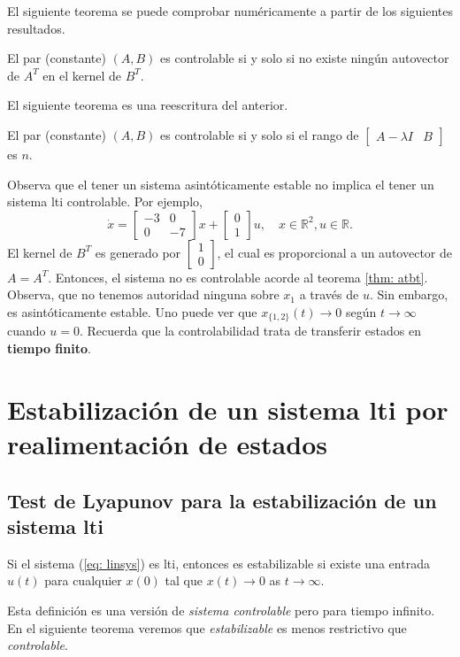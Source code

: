 El siguiente teorema se puede comprobar numéricamente a partir de los siguientes resultados.
\begin{theorem}
	\label{thm: atbt}
	El par (constante) $(A,B)$ es controlable si y solo si no existe ningún autovector de $A^T$ en el kernel de $B^T$.
\end{theorem}
El siguiente teorema es una reescritura del anterior.
\begin{theorem}
El par (constante) $(A,B)$ es controlable si y solo si el rango de $\begin{bmatrix}A-\lambda I & B\end{bmatrix}$ es $n$.
\end{theorem}

\begin{remark}
	Observa que el tener un sistema asintóticamente estable no implica el tener 
	un sistema lti controlable. Por ejemplo, 
\begin{equation}
	\dot x = \begin{bmatrix}-3 & 0 \\ 0 & -7\end{bmatrix}x + \begin{bmatrix}0 \\ 1\end{bmatrix}u, \quad x\in\mathbb{R}^2, u\in\mathbb{R}.
\end{equation}
	El kernel de $B^T$ es generado por $\begin{bmatrix}1 \\ 0\end{bmatrix}$, el cual es proporcional a un autovector de $A = A^T$. Entonces, el sistema no es controlable acorde al teorema \ref{thm: atbt}. Observa, que no tenemos autoridad ninguna sobre $x_1$ a través de $u$. Sin embargo, es asintóticamente estable. Uno puede ver que $x_{\{1,2\}}(t) \to 0$ según $t\to\infty$ cuando $u = 0$. Recuerda que la controlabilidad trata de transferir estados en \textbf{tiempo finito}.
\end{remark}

\section{Estabilización de un sistema lti por realimentación de estados}
\label{sec: reak}
\subsection{Test de Lyapunov para la estabilización de un sistema lti}
\begin{definition}
	Si el sistema (\ref{eq: linsys}) es lti, entonces es estabilizable si existe una entrada $u(t)$ para cualquier $x(0)$ tal que $x(t)\to 0$ as $t\to\infty$.
\end{definition}
Esta definición es una versión de \emph{sistema controlable} pero para tiempo infinito. En el siguiente teorema veremos que \emph{estabilizable} es menos restrictivo que \emph{controlable}.

